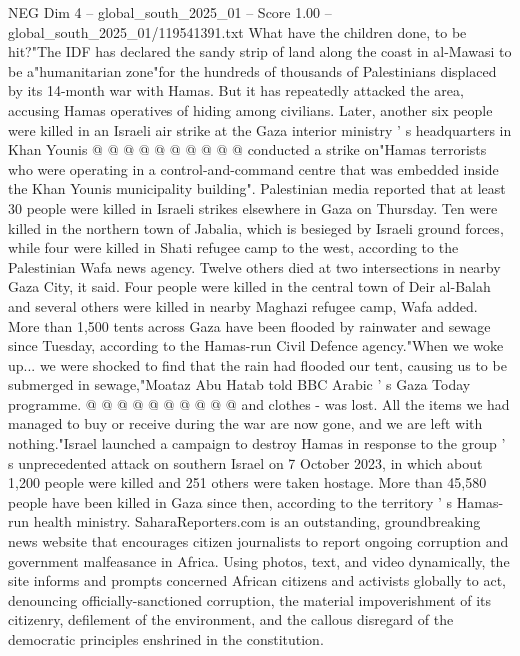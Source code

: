 \begin{textsample}{NEG Dim 4 – global\_south\_2025\_01 – Score 1.00 – global\_south\_2025\_01/119541391.txt}
What have the children done, to be hit?"The IDF has declared the sandy strip of land along the coast in al-Mawasi to be a"humanitarian zone"for the hundreds of thousands of Palestinians displaced by its 14-month war with Hamas.
But it has repeatedly attacked the area, accusing Hamas operatives of hiding among civilians.
Later, another six people were killed in an Israeli air strike at the Gaza interior ministry ' s headquarters in Khan Younis @ @ @ @ @ @ @ @ @ @ conducted a strike on"Hamas terrorists who were operating in a control-and-command centre that was embedded inside the Khan Younis municipality building".
Palestinian media reported that at least 30 people were killed in Israeli strikes elsewhere in Gaza on Thursday.
Ten were killed in the northern town of Jabalia, which is besieged by Israeli ground forces, while four were killed in Shati refugee camp to the west, according to the Palestinian Wafa news agency.
Twelve others died at two intersections in nearby Gaza City, it said.
Four people were killed in the central town of Deir al-Balah and several others were killed in nearby Maghazi refugee camp, Wafa added.
More than 1,500 tents across Gaza have been flooded by rainwater and sewage since Tuesday, according to the Hamas-run Civil Defence agency."When we woke up... we were shocked to find that the rain had flooded our tent, causing us to be submerged in sewage,"Moataz Abu Hatab told BBC Arabic ' s Gaza Today programme. @ @ @ @ @ @ @ @ @ @ and clothes - was lost.
All the items we had managed to buy or receive during the war are now gone, and we are left with nothing."Israel launched a campaign to destroy Hamas in response to the group ' s unprecedented attack on southern Israel on 7 October 2023, in which about 1,200 people were killed and 251 others were taken hostage.
More than 45,580 people have been killed in Gaza since then, according to the territory ' s Hamas-run health ministry.
SaharaReporters.com is an outstanding, groundbreaking news website that encourages citizen journalists to report ongoing corruption and government malfeasance in Africa.
Using photos, text, and video dynamically, the site informs and prompts concerned African citizens and activists globally to act, denouncing officially-sanctioned corruption, the material impoverishment of its citizenry, defilement of the environment, and the callous disregard of the democratic principles enshrined in the constitution.

\end{textsample}
